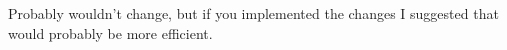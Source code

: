\documentclass{report}
\begin{document}
Probably wouldn't change, but if you implemented the changes I suggested that would probably be more efficient.
                                                                                                                                                                                                                                                                                                                                                                                                                                                                                                                                                                                                                                                                                                                                                                                                                                                                                                                                                                                                                                                                                                                                                                                                                                                                                                                                                                                                                                                                                                                                                                                                                                                                                                                                                                                                                                                                                                                                                                                                                                                                                                                                                                                                                                                                                                                                                                                                                                                                                                                                                                                                                                                                                                                                                                                                                                                                                                                                                                                                                                                                                                                                                                                                                                                                                                                                                        
\end{document}
